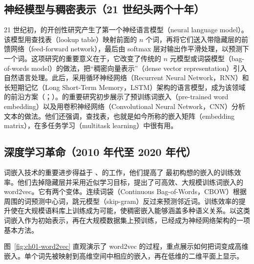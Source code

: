 \subsection{神经模型与稠密表示（21 世纪头两个十年）}
21 世纪初，的开创性研究产生了第一个神经语言模型（neural language model）。该模型用查找表（lookup table）映射前面的 $n$ 个词，再将它们送入带隐藏层的前馈网络（feed-forward network），最后由 softmax 层对输出作平滑处理，以预测下一个词。这项研究的重要意义在于，它改变了传统的 $n$ 元模型或词袋模型（bag-of-words model）的做法，把“稠密向量表示”（dense vector representation）引入自然语言处理。此后，采用循环神经网络（Recurrent Neural Network，RNN）和长短期记忆（Long Short-Term Memory，LSTM）架构的语言模型，成为该领域的前沿方案（；）。的重要研究初步展示了预训练词嵌入（pre-trained word embedding）以及用卷积神经网络（Convolutional Neural Network，CNN）分析文本的做法。他们还强调，查找表，也就是如今所称的嵌入矩阵（embedding matrix），在多任务学习（multitask learning）中很有用。

\subsection{深度学习革命（2010 年代至 2020 年代）}
词嵌入技术的重要进步得益于 、的工作，他们提高了 最初构想的嵌入的训练效率。他们去掉隐藏层并采用近似学习目标，提出了可高效、大规模训练词嵌入的 word2vec。它有两个变体。连续词袋（Continuous Bag-of-Words，CBOW）根据周围的词预测中心词，跳元模型（skip-gram）反过来预测邻近词。训练效率的提升使在大规模语料库上训练成为可能，使稠密嵌入能够涵盖多种语义关系。以这类词嵌入作为初始表示，再在大规模数据集上预训练，已经成为神经网络架构的一项基本方法。

图~\ref{fig:ch01-word2vec} 直观演示了 word2vec 的过程，重点展示如何把词变成高维嵌入。单个词先被映射到高维空间中相应的嵌入，再在低维的二维平面上显示。


